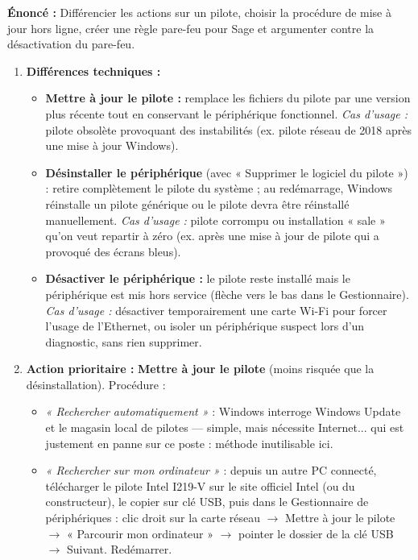 \documentclass[11pt]{article}
\begin{document}
\begin{corrige}
\textbf{Énoncé :} Différencier les actions sur un pilote, choisir la procédure de mise à jour hors ligne, créer une règle pare-feu pour Sage et argumenter contre la désactivation du pare-feu.
\tcblower
\begin{enumerate}
    \item \textbf{Différences techniques :}
    \begin{itemize}
        \item \textbf{Mettre à jour le pilote :} remplace les fichiers du pilote par une version plus récente tout en conservant le périphérique fonctionnel. \emph{Cas d'usage :} pilote obsolète provoquant des instabilités (ex. pilote réseau de 2018 après une mise à jour Windows).
        \item \textbf{Désinstaller le périphérique} (avec « Supprimer le logiciel du pilote ») : retire complètement le pilote du système ; au redémarrage, Windows réinstalle un pilote générique ou le pilote devra être réinstallé manuellement. \emph{Cas d'usage :} pilote corrompu ou installation « sale » qu'on veut repartir à zéro (ex. après une mise à jour de pilote qui a provoqué des écrans bleus).
        \item \textbf{Désactiver le périphérique :} le pilote reste installé mais le périphérique est mis hors service (flèche vers le bas dans le Gestionnaire). \emph{Cas d'usage :} désactiver temporairement une carte Wi-Fi pour forcer l'usage de l'Ethernet, ou isoler un périphérique suspect lors d'un diagnostic, sans rien supprimer.
    \end{itemize}
    \item \textbf{Action prioritaire :} \textbf{Mettre à jour le pilote} (moins risquée que la désinstallation). Procédure :
    \begin{itemize}
        \item \emph{« Rechercher automatiquement »} : Windows interroge Windows Update et le magasin local de pilotes — simple, mais nécessite Internet... qui est justement en panne sur ce poste : méthode inutilisable ici.
        \item \emph{« Rechercher sur mon ordinateur »} : depuis un autre PC connecté, télécharger le pilote Intel I219-V sur le site officiel Intel (ou du constructeur), le copier sur clé USB, puis dans le Gestionnaire de périphériques : clic droit sur la carte réseau $\rightarrow$ Mettre à jour le pilote $\rightarrow$ « Parcourir mon ordinateur » $\rightarrow$ pointer le dossier de la clé USB $\rightarrow$ Suivant. Redémarrer.

\end{itemize}
\end{enumerate}
\end{corrige}
\end{document}
